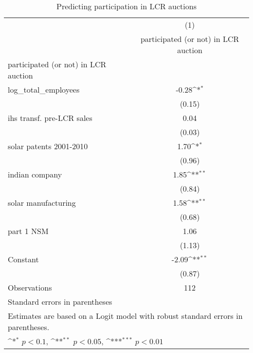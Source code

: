 \begin{table}[htbp]\centering
\def\sym#1{\ifmmode^{#1}\else\(^{#1}\)\fi}
\caption{Predicting participation in LCR auctions}
\begin{tabular*}{0.8\hsize}{@{\hskip\tabcolsep\extracolsep\fill}l*{1}{c}}
\hline\hline
                    &\multicolumn{1}{c}{(1)}\\
                    &\multicolumn{1}{c}{participated (or not) in LCR auction}\\
\hline
participated (or not) in LCR auction&                     \\
log\_total\_employees &       -0.28\sym{*}  \\
                    &      (0.15)         \\
[1em]
ihs transf. pre-LCR sales&        0.04         \\
                    &      (0.03)         \\
[1em]
solar patents 2001-2010&        1.70\sym{*}  \\
                    &      (0.96)         \\
[1em]
indian company      &        1.85\sym{**} \\
                    &      (0.84)         \\
[1em]
solar manufacturing &        1.58\sym{**} \\
                    &      (0.68)         \\
[1em]
part 1 NSM          &        1.06         \\
                    &      (1.13)         \\
[1em]
Constant            &       -2.09\sym{**} \\
                    &      (0.87)         \\
\hline
Observations        &         112         \\
\hline\hline
\multicolumn{2}{l}{\footnotesize Standard errors in parentheses}\\
\multicolumn{2}{l}{\footnotesize Estimates are based on a Logit model with robust standard errors in parentheses.}\\
\multicolumn{2}{l}{\footnotesize \sym{*} \(p<0.1\), \sym{**} \(p<0.05\), \sym{***} \(p<0.01\)}\\
\end{tabular*}
\end{table}
